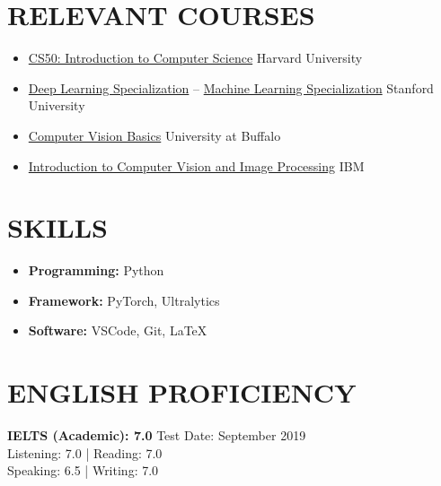 \documentclass[a4paper,9pt]{extarticle}
\begin{document}
\section*{RELEVANT COURSES}
\begin{itemize}
    \item \href{https://certificates.cs50.io/3f3f35e9-bda6-4487-84a3-2d11b3706bba.pdf?size=letter}{CS50: Introduction to Computer Science} \hfill Harvard University
    \item \href{https://www.credly.com/badges/6dfef240-b0c0-423f-9c94-897d0940c790/public_url}{Deep Learning Specialization} -- \href{https://www.coursera.org/account/accomplishments/specialization/N234W2TA9VF3}{Machine Learning Specialization} \hfill Stanford University
    \item \href{https://www.coursera.org/account/accomplishments/certificate/L9TKVLPXS79W}{Computer Vision Basics} \hfill University at Buffalo
    \item \href{https://www.credly.com/go/GHFkiYLI}{Introduction to Computer Vision and Image Processing} \hfill IBM
\end{itemize}

\section*{SKILLS}
\begin{itemize}
    \item \textbf{Programming:} Python
    \item \textbf{Framework:} PyTorch, Ultralytics
    \item \textbf{Software:} VSCode, Git, LaTeX
\end{itemize}

\section*{ENGLISH PROFICIENCY}
\noindent\textbf{IELTS (Academic): 7.0} \hfill Test Date: September 2019\\ 
Listening: 7.0 | Reading: 7.0 \\
Speaking: 6.5 | Writing: 7.0 
\end{document}

